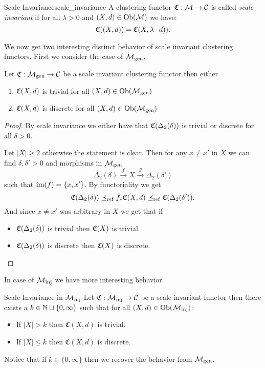 \begin{definition}{Scale Invariance}{scale_invariance}
    A clustering functor $\mathfrak{C}: \mathcal{M} \to \mathcal{C}$ is called \emph{scale invariant} if for all $\lambda > 0$ and $(X,d) \in \mathrm {Ob}(\mathcal{M})$ we have:
    \begin{equation*}
        \mathfrak{C}((X,d)) = \mathfrak{C}(X,\lambda \cdot d)).
    \end{equation*}
\end{definition}

We now get two interesting distinct behavior of scale invariant clustering functors. First we consider the case of ${\mathcal{M}_\mathrm{gen}}$.

\begin{proposition}{}{}
    Let $\mathfrak{C}: {\mathcal{M}_\mathrm{gen}} \to \mathcal{C}$ be a scale invariant clustering functor then either
    \begin{enumerate}
        \item $\mathfrak{C}(X,d)$ is trivial for all $(X,d) \in \mathrm {Ob}({\mathcal{M}_\mathrm{gen}})$
        \item $\mathfrak{C}(X,d)$ is discrete for all $(X,d) \in \mathrm {Ob}({\mathcal{M}_\mathrm{gen}})$
    \end{enumerate}
\end{proposition}

\begin{proof}
    \source[]
    By scale invariance we either have that $\mathfrak{C}(\Delta_2(\delta))$ is trivial or discrete for all $\delta > 0$.

    Let $|X| \ge 2$ otherwise the statement is clear. Then for any $x \neq x'$ in $X$ we can find $\delta, \delta' > 0$ and morphisms in ${\mathcal{M}_\mathrm{gen}}$
    $$
    \Delta_2(\delta) \overset{f}\longrightarrow X \overset{g}\longrightarrow \Delta_2(\delta')
    $$
    such that $\operatorname*{im}(f) = \{x, x'\}$. By functoriality we get
    $$
    \mathfrak{C}(\Delta_2(\delta)) \preceq_\mathrm{ref} f_*\mathfrak{C}(X,d) \preceq_\mathrm{ref} \mathfrak{C}(\Delta_2(\delta')).
    $$
    And since $x \neq x'$ was arbitrary in $X$ we get that if
    \begin{itemize}
        \item $\mathfrak{C}(\Delta_2(\delta))$ is trivial then $\mathfrak{C}(X)$ is trivial.
        \item $\mathfrak{C}(\Delta_2(\delta))$ is discrete then $\mathfrak{C}(X)$ is discrete.
    \end{itemize}
\end{proof}

In case of ${\mathcal{M}_\mathrm{inj}}$ we have more interesting behavior.

\begin{proposition}{Scale Invariance in ${\mathcal{M}_\mathrm{inj}}$}{}
    Let $\mathfrak{C}: {\mathcal{M}_\mathrm{inj}} \to \mathcal{C}$ be a scale invariant functor then there exists a $k \in \mathbb N \sqcup \{0, \infty\}$ such that for all $(X,d) \in \mathrm {Ob}({\mathcal{M}_\mathrm{inj}})$:

    \begin{itemize}
        \item If $|X| > k$ then $\mathfrak{C}(X,d)$ is trivial.
        \item If $|X| \le k$ then $\mathfrak{C}(X,d)$ is discrete.
    \end{itemize}

    Notice that if $k \in \{0, \infty\}$ then we recover the behavior from ${\mathcal{M}_\mathrm{gen}}$.
\end{proposition}

